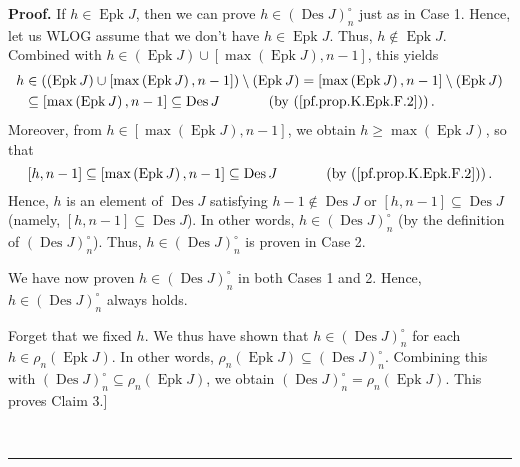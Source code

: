 \documentclass[numbers=enddot,12pt,final,onecolumn,notitlepage]{scrartcl}%
\theoremstyle{definition}
\newenvironment{proof}[1][Proof]{\noindent\textbf{#1.} }{\ \rule{0.5em}{0.5em}}
\begin{document}
\begin{proof}
If $h\in\operatorname*{Epk}J$, then we can prove $h\in\left(
\operatorname*{Des}J\right)  _{n}^{\circ}$ just as in Case 1. Hence, let us
WLOG assume that we don't have $h\in\operatorname*{Epk}J$. Thus,
$h\notin\operatorname*{Epk}J$. Combined with $h\in\left(  \operatorname*{Epk}%
J\right)  \cup\left[  \max\left(  \operatorname*{Epk}J\right)  ,n-1\right]  $,
this yields%
\begin{align*}
h  &  \in\left(  \left(  \operatorname*{Epk}J\right)  \cup\left[  \max\left(
\operatorname*{Epk}J\right)  ,n-1\right]  \right)  \setminus\left(
\operatorname*{Epk}J\right)  =\left[  \max\left(  \operatorname*{Epk}J\right)
,n-1\right]  \setminus\left(  \operatorname*{Epk}J\right) \\
&  \subseteq\left[  \max\left(  \operatorname*{Epk}J\right)  ,n-1\right]
\subseteq\operatorname*{Des}J\ \ \ \ \ \ \ \ \ \ \left(  \text{by
(\ref{pf.prop.K.Epk.F.2})}\right)  .
\end{align*}
Moreover, from $h\in\left[  \max\left(  \operatorname*{Epk}J\right)
,n-1\right]  $, we obtain $h\geq\max\left(  \operatorname*{Epk}J\right)  $, so
that%
\[
\left[  h,n-1\right]  \subseteq\left[  \max\left(  \operatorname*{Epk}%
J\right)  ,n-1\right]  \subseteq\operatorname*{Des}%
J\ \ \ \ \ \ \ \ \ \ \left(  \text{by (\ref{pf.prop.K.Epk.F.2})}\right)  .
\]
Hence, $h$ is an element of $\operatorname*{Des}J$ satisfying $h-1\notin%
\operatorname*{Des}J$ or $\left[  h,n-1\right]  \subseteq\operatorname*{Des}J$
(namely, $\left[  h,n-1\right]  \subseteq\operatorname*{Des}J$). In other
words, $h\in\left(  \operatorname*{Des}J\right)  _{n}^{\circ}$ (by the
definition of $\left(  \operatorname*{Des}J\right)  _{n}^{\circ}$). Thus,
$h\in\left(  \operatorname*{Des}J\right)  _{n}^{\circ}$ is proven in Case 2.

We have now proven $h\in\left(  \operatorname*{Des}J\right)  _{n}^{\circ}$ in
both Cases 1 and 2. Hence, $h\in\left(  \operatorname*{Des}J\right)
_{n}^{\circ}$ always holds.

Forget that we fixed $h$. We thus have shown that $h\in\left(
\operatorname*{Des}J\right)  _{n}^{\circ}$ for each $h\in\rho_{n}\left(
\operatorname*{Epk}J\right)  $. In other words, $\rho_{n}\left(
\operatorname*{Epk}J\right)  \subseteq\left(  \operatorname*{Des}J\right)
_{n}^{\circ}$. Combining this with $\left(  \operatorname*{Des}J\right)
_{n}^{\circ}\subseteq\rho_{n}\left(  \operatorname*{Epk}J\right)  $, we obtain
$\left(  \operatorname*{Des}J\right)  _{n}^{\circ}=\rho_{n}\left(
\operatorname*{Epk}J\right)  $. This proves Claim 3.]


\end{proof}
\end{document}
